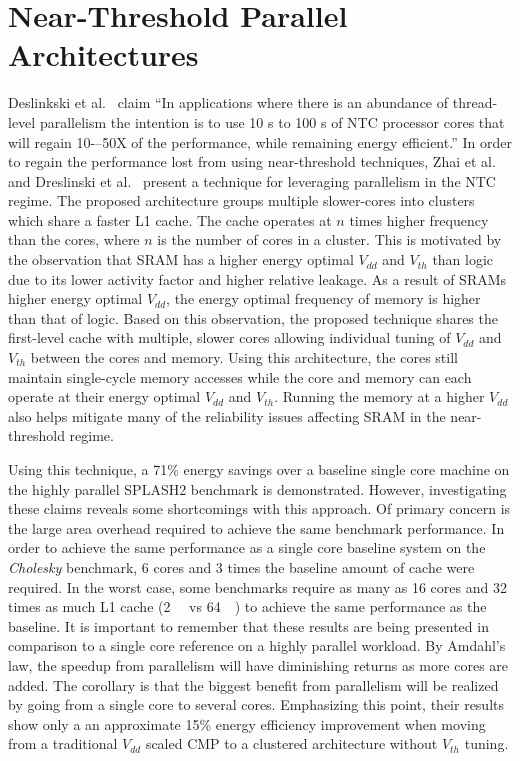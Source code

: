 \section{Near-Threshold Parallel Architectures} \label{sec:clustering}

Deslinkski et al.~\cite{dreslinski2010near} claim ``In applications where there
is an abundance of thread-level parallelism the intention is to use 10 s to 100
s of NTC processor cores that will regain 10-–50X of the performance, while
remaining energy efficient.'' In order to regain the performance lost from using
near-threshold techniques, Zhai et al.~\cite{Zhai:2007kn} and Dreslinski et
al.~\cite{Dreslinski:2007id} present a technique for leveraging parallelism in
the NTC regime. The proposed architecture groups multiple slower-cores into
clusters which share a faster L1 cache. The cache operates at $n$ times higher
frequency than the cores, where $n$ is the number of cores in a cluster. This is
motivated by the observation that SRAM has a higher energy optimal $V_{dd}$ and
$V_{th}$ than logic due to its lower activity factor and higher relative
leakage.  As a result of SRAMs higher energy optimal $V_{dd}$, the energy
optimal frequency of memory is higher than that of logic.  Based on this
observation, the proposed technique shares the first-level cache with multiple,
slower cores allowing individual tuning of $V_{dd}$ and $V_{th}$ between the
cores and memory. Using this architecture, the cores still maintain single-cycle
memory accesses while the core and memory can each operate at their energy
optimal $V_{dd}$ and $V_{th}$. Running the memory at a higher $V_{dd}$ also
helps mitigate many of the reliability issues affecting SRAM in the
near-threshold regime.

Using this technique, a 71\% energy savings over a baseline single core machine
on the highly parallel SPLASH2 benchmark is demonstrated. However, investigating
these claims reveals some shortcomings with this approach.  Of primary concern
is the large area overhead required to achieve the same benchmark performance.
In order to achieve the same performance as a single core baseline system on the
\emph{Cholesky} benchmark, 6 cores and 3 times the baseline amount of cache were
required.  In the worst case, some benchmarks require as many as 16 cores and 32
times as much L1 cache (\SI{2}{\mega\byte} vs \SI{64}{\kilo\byte}) to achieve
the same performance as the baseline.  It is important to remember that these
results are being presented in comparison to a single core reference on a highly
parallel workload. By Amdahl's law, the speedup from parallelism will have
diminishing returns as more cores are added.  The corollary is that the biggest
benefit from parallelism will be realized by going from a single core to several
cores. Emphasizing this point, their results show only a an approximate 15\%
energy efficiency improvement when moving from a traditional $V_{dd}$ scaled CMP
to a clustered architecture without $V_{th}$ tuning.

